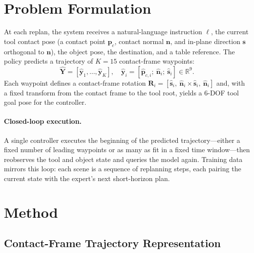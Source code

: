 \documentclass[11pt]{article}
\begin{document}
\section{Problem Formulation}

At each replan, the system receives a natural-language instruction $\ell$, the current tool contact pose (a contact point $\mathbf{p}_c$, contact normal $\mathbf{n}$, and in-plane direction $\mathbf{s}$ orthogonal to $\mathbf{n}$), the object pose, the destination, and a table reference.
The policy predicts a trajectory of $K{=}15$ contact-frame waypoints:
\begin{equation}
  \hat{\mathbf{Y}} = [\hat{\mathbf{y}}_1, \ldots, \hat{\mathbf{y}}_K], \quad
  \hat{\mathbf{y}}_i = [\hat{\mathbf{p}}_{c,i};\ \hat{\mathbf{n}}_i;\ \hat{\mathbf{s}}_i] \in \mathbb{R}^9.
\end{equation}
Each waypoint defines a contact-frame rotation $\mathbf{R}_i = [\hat{\mathbf{s}}_i,\ \hat{\mathbf{n}}_i \times \hat{\mathbf{s}}_i,\ \hat{\mathbf{n}}_i]$ and, with a fixed transform from the contact frame to the tool root, yields a 6-DOF tool goal pose for the controller.

\paragraph{Closed-loop execution.}
A single controller executes the beginning of the predicted trajectory---either a fixed number of leading waypoints or as many as fit in a fixed time window---then reobserves the tool and object state and queries the model again.
Training data mirrors this loop: each scene is a sequence of replanning steps, each pairing the current state with the expert's next short-horizon plan.

\section{Method}

\subsection{Contact-Frame Trajectory Representation}
\label{sec:contact_frame}
\end{document}
